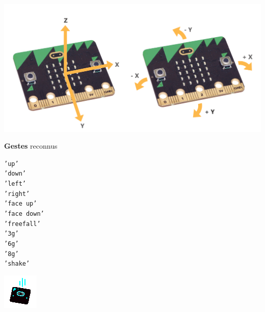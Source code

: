 \begin{minipage}[t]{0.25\linewidth}
	\strut\vspace*{-\baselineskip}\newline
	\begin{center}
		\includegraphics[width=1\linewidth]{res/ft_microbit_axes}
	\end{center}
	
	\textbf{Gestes} reconnus
	\begin{multicols}{2}
		\texttt{'up'}\\
		\texttt{'down'}\\
		\texttt{'left'}\\
		\texttt{'right'}\\
		\texttt{'face up'}\\
		\texttt{'face down'}\\
		\texttt{'freefall'}\\
		\texttt{'3g'}\\
		\texttt{'6g'}\\
		\texttt{'8g'}\\
		\texttt{'shake'}
	\end{multicols}

	\hfill \includegraphics[width=0.4\linewidth]{res/mbChutes.png}
\end{minipage}





